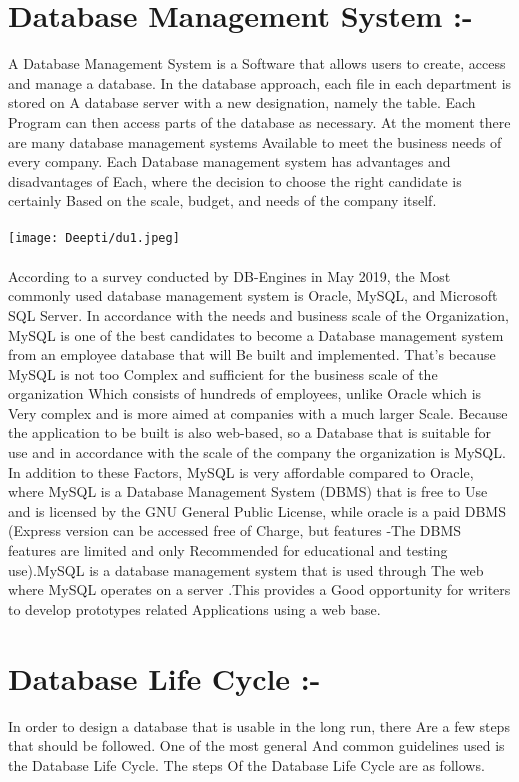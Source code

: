 \documentclass[12pt,a4paper]{article}
\begin{document}
\section*{Database Management System :-}A Database Management System is a Software that allows users to create, access and manage a database.
In the database approach, each file in each department is stored on A database server with a new designation, namely the table. Each Program can then access parts of the database as necessary.
At the moment there are many database management systems Available to meet the business needs of every company. Each Database management system has advantages and disadvantages of Each, where the decision to choose the right candidate is certainly Based on the scale, budget, and needs of the company itself.
\\
\\
\texttt{[image: Deepti/du1.jpeg]}
\\
\\
According to a survey conducted by DB-Engines in May 2019, the Most commonly used database management system is Oracle, MySQL, and Microsoft SQL Server.
In accordance with the needs and business scale of the Organization, MySQL is one of the best candidates to become a Database management system from an employee database that will Be built and implemented. That’s because MySQL is not too Complex and sufficient for the business scale of the organization Which consists of hundreds of employees, unlike Oracle which is Very complex and is more aimed at companies with a much larger Scale. Because the application to be built is also web-based, so a Database that is suitable for use and in accordance with the scale of the company the organization is MySQL. In addition to these Factors, MySQL is very affordable compared to Oracle, where MySQL is a Database Management System (DBMS) that is free to Use and is licensed by the GNU General Public License, while oracle is a paid DBMS (Express version can be accessed free of Charge, but features -The DBMS features are limited and only Recommended for educational and testing use).MySQL is a database management system that is used through The web where MySQL operates on a server .This provides a Good opportunity for writers to develop prototypes related Applications using a web base.
\section*{Database Life Cycle :-}In order to design a database that is usable in the long run, there Are a few steps that should be followed. One of the most general And common guidelines used is the Database Life Cycle. 
The steps Of the Database Life Cycle are as follows.
\end{document}
